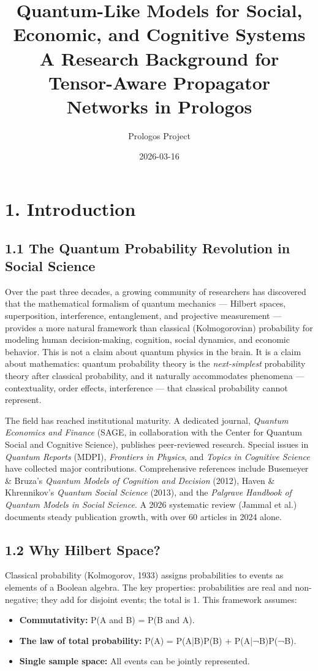 \documentclass[11pt]{article}
\author{Prologos Project}
\date{2026-03-16}
\title{Quantum-Like Models for Social, Economic, and Cognitive Systems\\\medskip
\large A Research Background for Tensor-Aware Propagator Networks in Prologos}
\begin{document}
\maketitle
\tableofcontents

\section{1. Introduction}
\label{sec:org1f81317}

\subsection{1.1 The Quantum Probability Revolution in Social Science}
\label{sec:org676a9dc}

Over the past three decades, a growing community of researchers has discovered
that the mathematical formalism of quantum mechanics --- Hilbert spaces,
superposition, interference, entanglement, and projective measurement --- provides
a more natural framework than classical (Kolmogorovian) probability for modeling
human decision-making, cognition, social dynamics, and economic behavior. This is
not a claim about quantum physics in the brain. It is a claim about mathematics:
quantum probability theory is the \emph{next-simplest} probability theory after
classical probability, and it naturally accommodates phenomena --- contextuality,
order effects, interference --- that classical probability cannot represent.

The field has reached institutional maturity. A dedicated journal, \emph{Quantum
Economics and Finance} (SAGE, in collaboration with the Center for Quantum Social
and Cognitive Science), publishes peer-reviewed research. Special issues in
\emph{Quantum Reports} (MDPI), \emph{Frontiers in Physics}, and \emph{Topics in Cognitive
Science} have collected major contributions. Comprehensive references include
Busemeyer \& Bruza's \emph{Quantum Models of Cognition and Decision} (2012), Haven \&
Khrennikov's \emph{Quantum Social Science} (2013), and the \emph{Palgrave Handbook of
Quantum Models in Social Science}. A 2026 systematic review (Jammal et al.)
documents steady publication growth, with over 60 articles in 2024 alone.
\subsection{1.2 Why Hilbert Space?}
\label{sec:org1768d98}

Classical probability (Kolmogorov, 1933) assigns probabilities to events as
elements of a Boolean algebra. The key properties: probabilities are real and
non-negative; they add for disjoint events; the total is 1. This framework
assumes:
\begin{itemize}
\item \textbf{Commutativity:} P(A and B) = P(B and A).
\item \textbf{The law of total probability:} P(A) = P(A|B)P(B) + P(A|¬B)P(¬B).
\item \textbf{Single sample space:} All events can be jointly represented.
\end{itemize}
\end{document}
